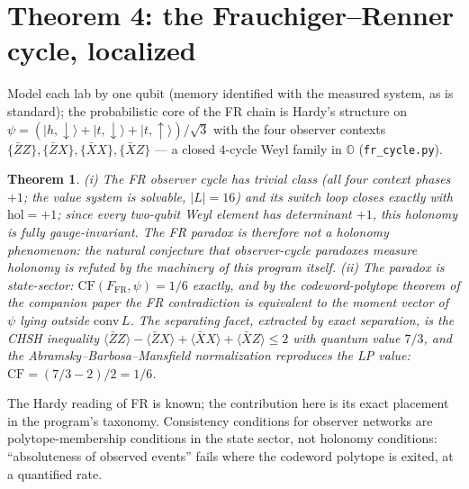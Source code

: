 \documentclass[11pt]{article}
\newtheorem{theorem}{Theorem}\newtheorem{lemma}{Lemma}\newtheorem{conjecture}{Conjecture}
\begin{document}
\section{Theorem 4: the Frauchiger--Renner cycle, localized}
Model each lab by one qubit (memory identified with the measured system, as is
standard); the probabilistic core of the FR chain is Hardy's structure on
$\psi=(|h,{\downarrow}\rangle+|t,{\downarrow}\rangle+|t,{\uparrow}\rangle)/\sqrt3$
with the four observer contexts
$\{\bar Z Z\},\{\bar Z X\},\{\bar X X\},\{\bar X Z\}$ --- a closed $4$-cycle
Weyl family in $\mathbb O$ (\texttt{fr\_cycle.py}).
\begin{theorem}\label{thm:fr}
(i) The FR observer cycle has trivial class (all four context phases $+1$; the value
system is solvable, $|L|=16$) and its switch loop closes exactly with
$\mathrm{hol}=+1$; since every two-qubit Weyl element has determinant $+1$, this
holonomy is fully gauge-invariant. The FR paradox is therefore \emph{not} a holonomy
phenomenon: the natural conjecture that observer-cycle paradoxes measure holonomy is
refuted by the machinery of this program itself.
(ii) The paradox is state-sector: $\mathrm{CF}(F_{\mathrm{FR}},\psi)=1/6$ exactly,
and by the codeword-polytope theorem of the companion paper \cite{paperC} the FR contradiction is
equivalent to the moment vector of $\psi$ lying outside $\mathrm{conv}\,L$. The
separating facet, extracted by exact separation, is the CHSH inequality
$\langle\bar ZZ\rangle-\langle\bar ZX\rangle+\langle\bar XX\rangle
+\langle\bar XZ\rangle\le2$ with quantum value $7/3$, and the
Abramsky--Barbosa--Mansfield normalization reproduces the LP value:
$\mathrm{CF}=(7/3-2)/2=1/6$.
\end{theorem}
The Hardy reading of FR is known; the contribution here is its exact placement in the
program's taxonomy. Consistency conditions for observer networks are polytope-membership
conditions in the state sector, not holonomy conditions: ``absoluteness of observed
events'' fails where the codeword polytope is exited, at a quantified rate.
\end{document}
